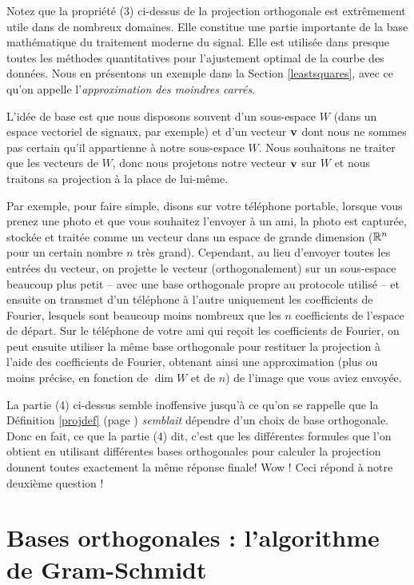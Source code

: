 Notez que la propriété (3) ci-dessus de la projection orthogonale est extrêmement utile dans de nombreux domaines. Elle constitue une partie importante de la base mathématique du traitement moderne du signal. Elle est utilisée dans presque toutes les méthodes quantitatives pour l'ajustement optimal de la courbe des données. Nous en présentons un exemple dans la Section \ref{leastsquares}, avec ce qu'on appelle l'\emph{approximation des moindres carrés}. 


L'idée de base est que nous disposons souvent d'un sous-espace $W$ (dans un espace vectoriel de signaux, par exemple) et d'un vecteur $\mathbf{v}$ dont nous ne sommes pas certain qu'il appartienne à notre sous-espace $W$. Nous souhaitons ne traiter que les vecteurs de $W$\kern-2pt, donc nous projetons notre vecteur $\mathbf{v}$ sur $W$ et nous traitons sa projection à la place de lui-même. 

Par exemple, pour faire simple, disons sur votre téléphone portable, lorsque vous prenez une photo et que vous souhaitez l'envoyer à un ami, la photo est capturée, stockée et traitée comme un vecteur dans un espace de grande dimension ($\mathbb{R}^n$ pour un certain nombre $n$ très grand). Cependant, au lieu d'envoyer toutes les entrées du vecteur, on projette le vecteur (orthogonalement) sur un sous-espace beaucoup plus petit -- avec une base orthogonale propre au protocole utilisé -- et ensuite on transmet d'un téléphone à l'autre uniquement les coefficients de Fourier, lesquels sont beaucoup moins nombreux que les $n$ coefficients de l'espace de départ. Sur le téléphone de votre ami qui reçoit les coefficients de Fourier, on peut ensuite utiliser la même base orthogonale pour restituer la projection à l'aide des coefficients de Fourier, obtenant ainsi une approximation (plus ou moins précise, en fonction de $\dim W$ et de $n$) de l'image que vous aviez envoyée.

La partie (4) ci-dessus semble inoffensive jusqu'à ce qu'on se rappelle que la Définition \ref{projdef} (page \pageref{projdef}) {\it semblait} dépendre d'un choix de base orthogonale. Donc en fait, ce que la partie (4) dit, c'est que les différentes formules que l'on obtient en utilisant différentes bases orthogonales pour calculer la projection donnent toutes exactement la même réponse finale! Wow ! Ceci répond à notre deuxième question !

\section{Bases orthogonales : l'algorithme de Gram-Schmidt}\label{section:Gram-Schmidt}

